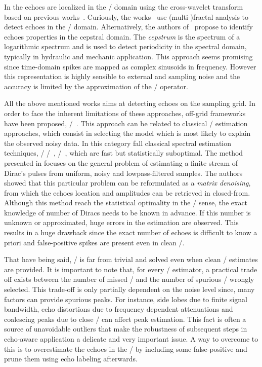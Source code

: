 In  the echoes are localized in the \TFdef/ domain using the cross-wavelet transform based on previous works~.
Curiously, the works~ use (multi-)fractal analysis to detect echoes in the \TFdef/ domain.
Alternatively, the authors of~ propose to identify echoes properties in the cepstral domain.
The \textit{cepstrum} is the spectrum of a logarithmic spectrum and is used to detect periodicity in the spectral domain, typically in hydraulic and mechanic application.
This approach seems promising since time-domain spikes are mapped as complex sinusoids in frequency.
However this representation is highly sensible to external and sampling noise and the accuracy is limited by the approximation of the \DFT/ operator.

\mynewline
All the above mentioned works aims at detecting echoes on the sampling grid.
In order to face the inherent limitations of these approaches, off-grid frameworks have been proposed, \eg/~.
This approach can be related to classical \MLdef/ estimation approaches, which consist in selecting the model which is most likely to explain the observed noisy data.
In this category fall classical spectral estimation techniques, \eg/ \MUSIC/~, \ESPRIT/~, which are fast but statistically suboptimal.
The method presented in  focuses on the general problem of estimating a finite stream of Dirac's pulses from uniform, noisy and lowpass-filtered samples.
The authors showed that this particular problem can be reformulated as a \textit{matrix denoising}, from which the echoes location and amplitudes can be retrieved in closed-from.
Although this method reach the statistical optimality in the \ML/ sense, the exact knowledge of number of Diracs needs to be known in advance.
If this number is unknown or approximated, huge errors in the estimation are observed.
This results in a huge drawback since the exact number of echoes is difficult to know a priori and false-positive spikes are present even in clean \RIRs/.

\mynewline
That have being said, \AER/ is far from trivial and solved even when clean \RIR/ estimates are provided.
It is important to note that, for every \TOA/ estimator, a practical trade off exists between the number of missed \TOAs/ and the number of spurious \TOAs/ wrongly selected.
This trade-off is only partially dependent on the noise level since, many factors can provide spurious peaks.
For instance, side lobes due to finite signal bandwidth, echo distortions due to frequency dependent attenuations and coalescing peaks due to close \TOAs/ can affect peak estimation.
This fact is often a source of unavoidable outliers that make the robustness of subsequent steps in echo-aware application a delicate and very important issue.
A way to overcome to this is to overestimate the echoes in the \RIR/ by including some false-positive and prune them using echo labeling afterwards.

